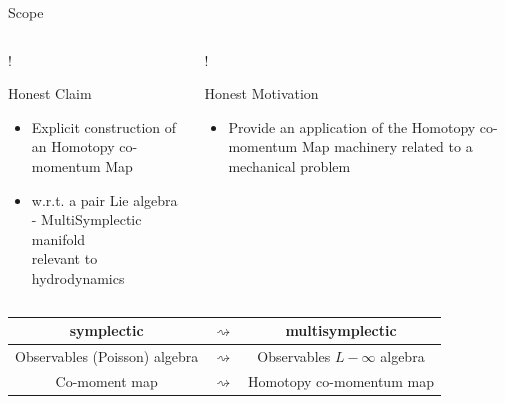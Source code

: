 \documentclass[handout,10pt]{beamer}
\begin{document}
  
  \begin{frame}{Scope}
	\begin{columns}
		\begin{column}[T]{0.5\textwidth}
	        \centering
	         {!} {
			}
			\begin{block}{Honest Claim}
				\begin{itemize}
					\item Explicit construction of an \alert{Homotopy co-momentum Map}
					\item w.r.t. a pair Lie algebra - MultiSymplectic manifold \\
							relevant to hydrodynamics %
				\end{itemize}
			\end{block}
		\end{column}
		\begin{column}[T]{0.5\textwidth} 
	        \centering
	         {!} {
			}
			\begin{block}{Honest Motivation}
				\begin{itemize}
					\item Provide an application of the Homotopy co-momentum Map machinery
						related to a mechanical problem
				\end{itemize}
			\end{block}		
		\end{column}
	\end{columns}
	\vspace{2ex}
	\begin{keywordblock}
		\begin{tabular}{|c|c|c|}
			\hline 
			symplectic & $\rightsquigarrow$ & multisymplectic \\ 
			\hline 
			Observables (Poisson) algebra & $\rightsquigarrow$ & Observables $L-\infty$ algebra \\ 
			\hline 
			Co-moment map & $\rightsquigarrow$ & Homotopy co-momentum map \\ 
			\hline 
		\end{tabular} 
	\end{keywordblock}
  \end{frame}
\end{document}
